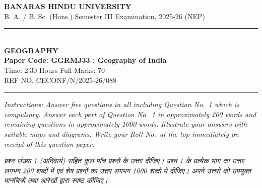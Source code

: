 \documentclass[11pt,a4paper]{article}
\begin{document}
\begin{center}
  {\large\bfseries BANARAS HINDU UNIVERSITY}\\[2pt]
  {\normalsize B. A. / B. Sc. (Hons.) Semester III Examination, 2025-26 (NEP)}\\[6pt]
  \rule{0.8\linewidth}{0.5pt}\\[6pt]
  {\large\bfseries GEOGRAPHY}\\[4pt]
  {\large\bfseries Paper Code: GGRMJ33 : Geography of India}\\[4pt]
  {\normalsize Time: 2:30 Hours \hfill Full Marks: 70}\\[2pt]
  {\small REF NO. CECONF/N/2025-26/088}
\end{center}
\rule{\linewidth}{0.4pt}
\smallskip

\noindent \textit{Instructions: Answer five questions in all including Question No.\ 1 which is compulsory. Answer each part of Question No.\ 1 in approximately 200 words and remaining questions in approximately 1000 words. Illustrate your answers with suitable maps and diagrams. Write your Roll No.\ at the top immediately on receipt of this question paper.}

\smallskip
\noindent \textit{प्रश्न संख्या 1 (अनिवार्य) सहित कुल पाँच प्रश्नों के उत्तर दीजिए। प्रश्न 1 के प्रत्येक भाग का उत्तर लगभग 200 शब्दों में एवं शेष प्रश्नों का उत्तर लगभग 1000 शब्दों में दीजिए। अपने उत्तरों को उपयुक्त मानचित्रों तथा आरेखों द्वारा स्पष्ट कीजिए।}

\bigskip
\end{document}
